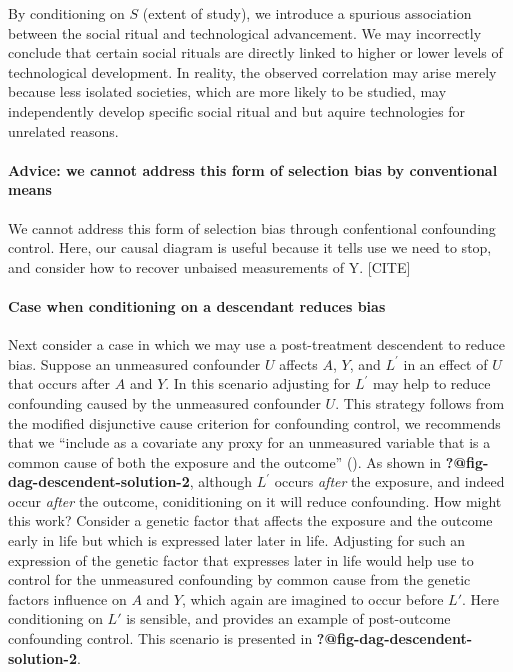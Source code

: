 \documentclass[
  singlecolumn,
  9pt]{article}
\let\oldparagraph\paragraph
\renewcommand{\paragraph}[1]{\oldparagraph{#1}\mbox{}}
\begin{document}
By conditioning on \(S\) (extent of study), we introduce a spurious
association between the social ritual and technological advancement. We
may incorrectly conclude that certain social rituals are directly linked
to higher or lower levels of technological development. In reality, the
observed correlation may arise merely because less isolated societies,
which are more likely to be studied, may independently develop specific
social ritual and but aquire technologies for unrelated reasons.

\paragraph{Advice: we cannot address this form of selection bias by
conventional
means}\label{advice-we-cannot-address-this-form-of-selection-bias-by-conventional-means}

We cannot address this form of selection bias through confentional
confounding control. Here, our causal diagram is useful because it tells
use we need to stop, and consider how to recover unbaised measurements
of Y. {[}CITE{]}

\paragraph{Case when conditioning on a descendant reduces
bias}\label{case-when-conditioning-on-a-descendant-reduces-bias}

Next consider a case in which we may use a post-treatment descendent to
reduce bias. Suppose an unmeasured confounder \(U\) affects \(A\),
\(Y\), and \(L^\prime\) in an effect of \(U\) that occurs after \(A\)
and \(Y\). In this scenario adjusting for \(L^\prime\) may help to
reduce confounding caused by the unmeasured confounder \(U\). This
strategy follows from the modified disjunctive cause criterion for
confounding control, we recommends that we ``include as a covariate any
proxy for an unmeasured variable that is a common cause of both the
exposure and the outcome'' (). As shown in \textbf{?@fig-dag-descendent-solution-2}, although
\(L^\prime\) occurs \emph{after} the exposure, and indeed occur
\emph{after} the outcome, coniditioning on it will reduce confounding.
How might this work? Consider a genetic factor that affects the exposure
and the outcome early in life but which is expressed later later in
life. Adjusting for such an expression of the genetic factor that
expresses later in life would help use to control for the unmeasured
confounding by common cause from the genetic factors influence on \(A\)
and \(Y\), which again are imagined to occur before \(L'\). Here
conditioning on \(L'\) is sensible, and provides an example of
post-outcome confounding control. This scenario is presented in
\textbf{?@fig-dag-descendent-solution-2}.
\end{document}

